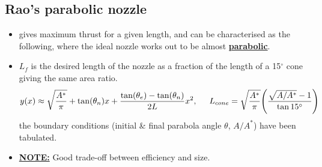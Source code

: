 \documentclass[a4paper,10pt]{article}
\begin{document}
\subsection{Rao's parabolic nozzle}
\begin{itemize}
    \item gives maximum thrust for a given length, and can be characterised as the following, where the ideal nozzle works out to be almost \underline{\textbf{parabolic}}. 
    \item $L_f$ is the desired length of the nozzle as a fraction of the length of a 15$^\circ$ cone giving the same area ratio.
    \begin{gather*}
        y(x)\approx\sqrt{\frac{A^*}{\pi}}+\tan(\theta_n)x+\frac{\tan(\theta_e)-\tan(\theta_n)}{2L}x^2,\hspace*{0.5cm}L_{cone} = \sqrt{\frac{A^*}{\pi}}\Bigg(\frac{\sqrt{A/A^*}-1}{\tan15^\circ}\Bigg)
    \end{gather*}
    the boundary conditions (initial \& final parabola angle $\theta$, $A/A^*$) have been tabulated.
    \item \underline{\textbf{NOTE:}} Good trade-off between efficiency and size. 
\end{itemize}
\end{document}
